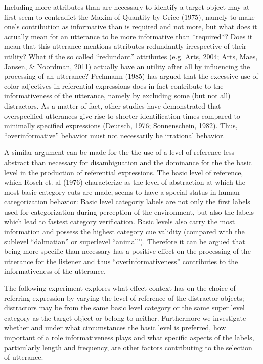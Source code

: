 \documentclass[10pt,letterpaper]{article}
\begin{document}
Including more attributes than are necessary to identify a target object may at first seem to contradict the Maxim of Quantity by Grice (1975), namely to make one's contribution as informative than is required and not more, but what does it actually mean for an utterance to be more informative than *required*? Does it mean that this utterance mentions attributes redundantly irrespective of their utility? What if the so called ``redundant'' attributes (e.g. Arts, 2004; Arts, Maes, Jansen, \& Noordman, 2011) actually have an utility after all by influencing the processing of an utterance? Pechmann (1985) has argued that the excessive use of color adjectives in referential expressions does in fact contribute to the informativeness of the utterance, namely by excluding some (but not all) distractors. As a matter of fact, other studies have demonstrated that overspecified utterances give rise to shorter identification times compared to minimally specified expressions (Deutsch, 1976; Sonnenschein, 1982). Thus, ``overinformative'' behavior must not necessarily be irrational behavior. 

A similar argument can be made for the the use of a level of reference less abstract than necessary for disambiguation and the dominance for the the basic level in the production of referential expressions. The basic level of reference, which Rosch et. al (1976) characterize as the level of abstraction at which the most basic category cuts are made, seems to have a special status in human categorization behavior: Basic level categoriy labels are not only the first labels used for categorization during perception of the environment, but also the labels which lead to fastest category verification. Basic levels also carry the most information and possess the highest category cue validity (compared with the sublevel ``dalmatian'' or superlevel ``animal''). Therefore it can be argued that being more specific than necessary has a positive effect on the processing of the utterance for the listener and thus ``overinformativeness'' contributes to the informativeness of the utterance.

The following experiment explores what effect context has on the choice of referring expression by varying the level of reference of the distractor objects; distractors may be from the same basic level category or the same super level category as the target object or belong to neither. Furthermore we investigate whether and under what circumstances the basic level is preferred, how important of a role informativeness plays and what specific aspects of the labels, particularly length and frequency, are other factors contributing to the selection of utterance. 
\end{document}
